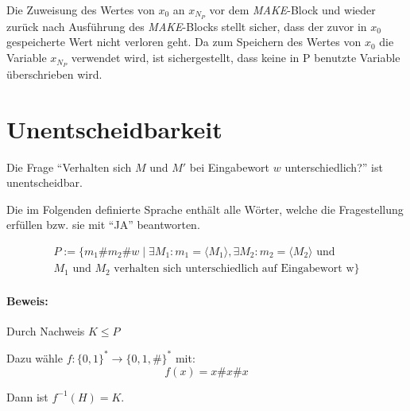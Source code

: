\documentclass[10pt,leqno ]{article}
\begin{document}
Die Zuweisung des Wertes von $x_0$ an $x_{N_P}$ vor dem \textit{MAKE}-Block und wieder zurück nach Ausführung des \textit{MAKE}-Blocks stellt sicher, dass der zuvor in $x_0$ gespeicherte Wert nicht verloren geht. Da zum Speichern des Wertes von $x_0$ die Variable $x_{N_P}$ verwendet wird, ist sichergestellt, dass keine in P benutzte Variable überschrieben wird.

\pagebreak

\section{Unentscheidbarkeit}

Die Frage \enquote{Verhalten sich $M$ und $M'$ bei Eingabewort $w$ unterschiedlich?} ist unentscheidbar.
\begin{flushleft}
Die im Folgenden definierte Sprache enthält alle Wörter, welche die Fragestellung erfüllen bzw. sie mit \enquote{JA} beantworten.
\end{flushleft}
\begin{align*}
    P := \{ m_1 \# m_2 \# w \mid \exists M_1 : m_1 = \langle M_1 \rangle , \exists M_2 : m_2 = \langle M_2 \rangle \text{ und } \\ M_1 \text{ und } M_2 \text{ verhalten sich unterschiedlich auf Eingabewort w} \}
\end{align*}

\paragraph{Beweis:} Durch Nachweis $K \leq P$
\begin{flushleft}
    Dazu wähle $f: \{ 0, 1 \}^* \rightarrow \{ 0,1,\# \}^*$ mit: 
    \[ f(x) = x\#x\#x \]
\end{flushleft}

\begin{flushleft}
    Dann ist $f^{-1}(H) = K$.
\end{flushleft}
\end{document}
